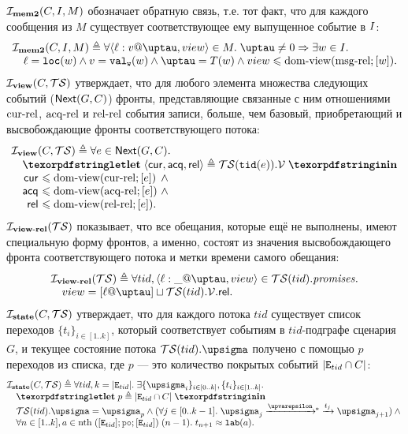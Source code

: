   $\mathcal{I}_{\rm \bf mem2}(C, I, M)$ обозначает обратную связь, т.е. тот факт, что для каждого сообщения из $M$ существует
  соответствующее ему выпущенное событие в $I$:
  \[\inarr{
  \invMemTwo(C, \IssuedSet, M) \defeq \forall \msg{\loc}{\val}{\tau}{\view} \in M. \; \tau \neq 0 \Rightarrow
    \exists w \in \IssuedSet. \; \\
  \quad \loc = \lLOC(w) \land \val = \lVALW(w) \land \tau = T(w) \land \view \le \domView(\msgRel; [w]). \\
  }\]
  $\mathcal{I}_{\rm \bf view}(C, \mathcal{TS})$ утверждает, что для любого элемента множества следующих событий (${\sf Next}(G, C)$)
  фронты, представляющие связанные с ним отношениями ${\rm cur\text{-}rel}$, ${\rm acq\text{-}rel}$ и ${\rm rel\text{-}rel}$ события записи, больше, чем
  базовый, приобретающий и высвобождающие фронты соответствующего потока:
  \[\inarr{
  \invView(C, \TSf) \defeq
  \forall e \in \nextset(G, C). \\
  \quad \letdef{\tup{\viewCur, \viewAcq, \viewfRel}}{\TSf(\lTID(e)).\View} \\
  \quad
  \begin{array}{@{}r@{~}l@{~}l}
    \viewCur & \le \domView(\curRel; [e]) & \land {} \\
    \viewAcq & \le \domView(\acqRel; [e]) & \land {} \\
    \viewfRel & \le \domView(\relRel; [e]). \\
  \end{array}
  }\]
  $\mathcal{I}_{\rm \bf view\text{-}rel}(\mathcal{TS})$ показывает, что все обещания, которые ещё не выполнены, имеют специальную форму
  фронтов, а именно, состоят  из значения высвобождающего фронта соответствующего потока и метки времени самого обещания:
  \[\inarr{
  \invViewRel(\TSf) \defeq \forall tid, \msg{\loc}{\_}{\tau}{view} \in \TSf(tid).\PromSet. \\
    \quad view = [\loc @ \tau] \sqcup \TSf(tid).\View.\viewfRel. \\
  }\]
  $\mathcal{I}_{\rm \bf state}(C, \mathcal{TS})$ утверждает, что для каждого потока $tid$ существует список переходов $\{t_i\}_{i \in [1..k]}$,
  который соответствует событиям в $tid$-подграфе сценария $G$, и текущее состояние потока $\TSf(tid).\sigma$
  получено с помощью $p$ переходов из списка, где $p$ --- это количество покрытых событий $|{\mathtt{E}}_{tid} \cap C|$:
  \[\inarr{
  \invState(C, \TSf) \defeq \forall tid, k = |\lEID|. \;
     \exists \{\pstate_i\}_{i \in [0 .. k]}, \{t_i\}_{i \in [1..k]}. \; \\
  \quad \letdef{p}{|\lEID \cap C|} \\
  \quad \TSf(tid).\pstate = \pstate_{p} \land 
    (\forall j \in [0..k-1]. \; \pstate_j \astep{\epsilon}\!\!^{*}\astep{t_j} \pstate_{j + 1})\land {} \\
  \quad \forall n \in [1..k], a \in \nthf \; ([\lEID]; \lPO; [\lEID]) \; (n - 1). \;
    t_{n + 1} \approx \lLAB(a).
  }\]

